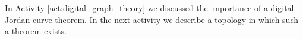 \begin{comment}
Let $Q_1$ and $Q_2$ be the two points in the ``interior" of $S_2$. Neither $Q_1$ nor $Q_2$ is $4$-connected to any other point in $\Z^2 \setminus S_2$, so $\{Q_1\}$ and $\{Q_2\}$ are two $4$-connected components of $\Z^2 \setminus S_2$. Let $B = \Z^2 \setminus (S_2 \cup \{Q_1\} \cup \{Q_2\})$. Any two points in $B$ are $4$-connected, so $B$ is also a $4$-component of $\Z^2 \setminus S_2$. 

Now $Q_1$ and $Q_2$ are $8$-connected, but neither is $8$-connected to any point in $B$. The set $B$ is $4$-connected, hence $8$-connected, and so $\Z^2 \setminus S_2$ has two $8$-components. 


\ea

\end{comment}

In Activity \ref{act:digital_graph_theory} we discussed the importance of a digital Jordan curve theorem. In the next activity we describe a topology in which such a theorem exists. 


